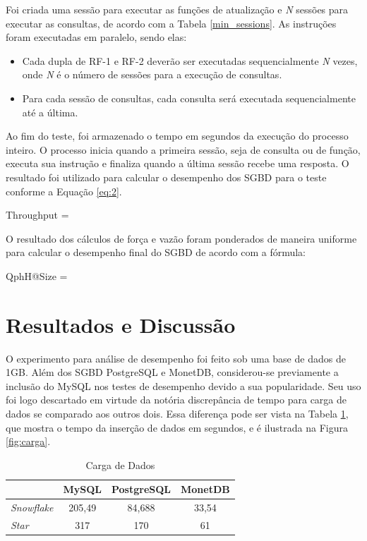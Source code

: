 \documentclass[conference]{IEEEtran}
\begin{document}
Foi criada uma sessão para executar as funções de atualização e \textit{N} sessões para executar as consultas, de acordo com a Tabela \ref{min_sessions}. As instruções foram executadas em paralelo, sendo elas:

\begin{itemize}
	\item Cada dupla de RF-1 e RF-2 deverão ser executadas sequencialmente \textit{N} vezes, onde \textit{N} é o número de sessões para a execução de consultas.
	\item Para cada sessão de consultas, cada consulta será executada sequencialmente até a última.
\end{itemize}

Ao fim do teste, foi armazenado o tempo em segundos da execução do processo inteiro. O processo inicia quando a primeira sessão, seja de consulta ou de função, executa sua instrução e finaliza quando a última sessão recebe uma resposta. O resultado foi utilizado para calcular o desempenho dos SGBD para o teste conforme a Equação \ref{eq:2}.

\begin{myequation}%
\label{eq:2}
{\scriptstyle Throughput} =  %
\end{myequation}
%

O resultado dos cálculos de força e vazão foram ponderados de maneira uniforme para calcular o desempenho final do SGBD de acordo com a fórmula:

\begin{myequation}%
\label{eq:3}
{ \scriptstyle QphH@Size =  } %
\end{myequation}
%

\section{Resultados e Discussão}

O experimento para análise de desempenho foi feito sob uma base de dados de 1GB. Além dos SGBD PostgreSQL e MonetDB, considerou-se previamente a inclusão do MySQL nos testes de desempenho devido a sua popularidade. Seu uso foi logo descartado em virtude da notória discrepância de tempo para carga de dados se comparado aos outros dois. Essa diferença pode ser vista na Tabela \ref{tab:carga}, que mostra o tempo da inserção de dados em segundos, e é ilustrada na Figura \ref{fig:carga}.

\begin{table}[htpb]
\centering
\caption{Carga de Dados}
\label{tab:carga}
\begin{tabular}{@{}lccc@{}}
\toprule
          & MySQL  & PostgreSQL & MonetDB \\ \midrule
\textit{Snowflake} & 205,49 & 84,688     & 33,54   \\
\textit{Star}      & 317    & 170        & 61      \\ \bottomrule
\end{tabular}
\end{table}
\end{document}
